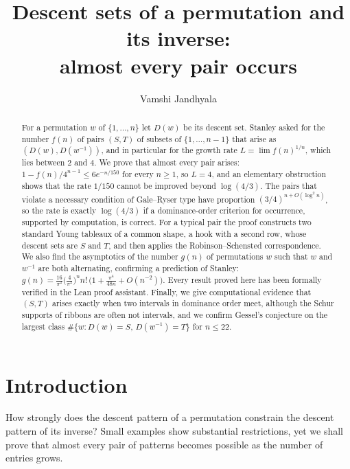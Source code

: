 \documentclass[12pt]{article}
\title{Descent sets of a permutation and its inverse:\\ almost every pair occurs}
\author{Vamshi Jandhyala}
\numberwithin{theorem}{section}
\numberwithin{equation}{section}
\begin{document}
\maketitle



\begin{abstract}
For a permutation $w$ of $\{1,\dots,n\}$ let $D(w)$ be its descent set. Stanley asked for the number
$f(n)$ of pairs $(S,T)$ of subsets of $\{1,\dots,n-1\}$ that arise as $(D(w),D(w^{-1}))$, and in particular
for the growth rate $L=\lim f(n)^{1/n}$, which lies between $2$ and $4$. We prove that almost every pair
arises: $1-f(n)/4^{n-1}\le 6e^{-n/150}$ for every $n\ge1$, so $L=4$, and an elementary obstruction shows that the rate $1/150$ cannot be improved beyond $\log(4/3)$. The pairs that violate a necessary condition of Gale--Ryser type have proportion $(3/4)^{n+O(\log^2n)}$, so the rate is exactly $\log(4/3)$ if a dominance-order criterion for occurrence, supported by computation, is correct. For a typical pair the proof
constructs two standard Young tableaux of a common shape, a hook with a second row, whose descent sets are
$S$ and $T$, and then applies the Robinson--Schensted correspondence. We also find the asymptotics of the
number $g(n)$ of permutations $w$ such that $w$ and $w^{-1}$ are both alternating, confirming a prediction of
Stanley: $g(n)=\frac{16}{\pi^2}\bigl(\frac{4}{\pi^2}\bigr)^n n!\,\bigl(1+\frac{\pi^4}{48n}+O(n^{-2})\bigr)$.
Every result proved here has been formally verified in the Lean proof assistant. Finally, we give computational
evidence that $(S,T)$ arises exactly when two intervals in dominance order meet, although the Schur supports
of ribbons are often not intervals, and we confirm Gessel's conjecture on the largest class
$\#\{w:D(w)=S,\,D(w^{-1})=T\}$ for $n\le22$.
\end{abstract}

\section{Introduction}

How strongly does the descent pattern of a permutation constrain the descent pattern of its inverse? Small examples show substantial restrictions, yet we shall prove that almost every pair of patterns becomes possible as the number of entries grows.
\end{document}
